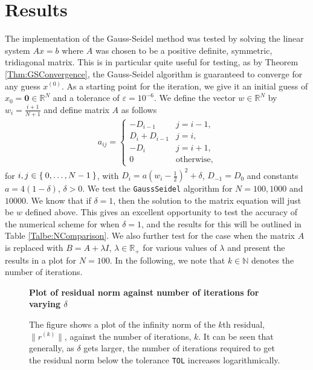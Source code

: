 \documentclass[a4paper,11pt]{article}
\theoremstyle{break}
\theoremstyle{break2}
\theoremstyle{break}
\theoremstyle{break2}
\newcommand{\R}{\mathbb{R}}
\newcommand{\N}{\mathbb{N}}
\newcommand{\e}{\varepsilon}
\begin{document}
\section{Results}
The implementation of the Gauss-Seidel method was tested by solving the linear system $ Ax = b $ where $ A $ was chosen to be a positive definite, symmetric, tridiagonal matrix. This is in particular quite useful for testing, as by Theorem \ref{Thm:GSConvergence}, the Gauss-Seidel algorithm is guaranteed to converge for any guess $ x^{(0)} $. As a starting point for the iteration, we give it an initial guess of $ x_0 = \textbf{0} \in \R^N $ and a tolerance of $ \e = 10^{-6} $. We define the vector $ w \in \R^N $ by $ w_i = \frac{i+1}{N+1} $ and define matrix $ A $ as follows
\begin{align*}
a_{ij} =
\begin{cases}
- D_{i-1}		&	j = i-1, \\
D_i + D_{i-1}	&	j = i, \\
-D_i			&	j = i+1, \\
0				&	\text{otherwise,}
\end{cases}
\end{align*}
for $ i,j \in \Set{0,\ldots, N-1} $, with $ D_i = a(w_i - \frac{1}{2})^2 + \delta $, $ D_{-1} = D_0 $ and constants $ a = 4(1-\delta) $, $ \delta > 0 $. We test the \texttt{GaussSeidel} algorithm for $ N = 100, 1000 $ and $ 10000 $. We know that if $ \delta = 1 $, then the solution to the matrix equation will just be $ w $ defined above. This gives an excellent opportunity to test the accuracy of the numerical scheme for when $ \delta = 1 $, and the results for this will be outlined in Table \ref{Talbe:NComparison}. We also further test for the case when the matrix $ A $ is replaced with $ B = A + \lambda I $, $ \lambda \in \R_+ $ for various values of $ \lambda $ and present the results in a plot for $ N = 100 $. In the following, we note that $ k \in \N $ denotes the number of iterations.
\begin{figure}[h]
	\begin{center}
		\textbf{Plot of residual norm against number of iterations for varying $ \delta $}\par\medskip
		\resizebox{\linewidth}{\height}
		{
		
		}
		\caption{The figure shows a plot of the infinity norm of the $ k $th residual, $ \|r^{(k)}\| $, against the number of iterations, $ k $. It can be seen that generally, as $ \delta $ gets larger, the number of iterations required to get the residual norm below the tolerance \texttt{TOL} increases logarithmically.\label{Fig:DeltaPlot}}
	\end{center}
\end{figure}
\end{document}
